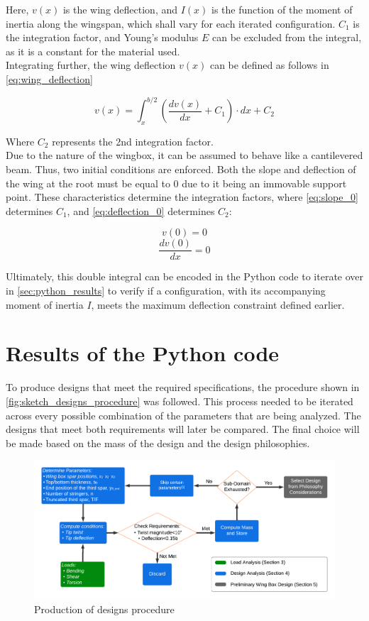 \noindent Here, $v(x)$ is the wing deflection, and $I(x)$ is the function of the moment of inertia along the wingspan, which shall vary for each iterated configuration. $C_1$ is the integration factor, and Young's modulus $E$ can be excluded from the integral, as it is a constant for the material used. \\


\noindent Integrating further, the wing deflection $v(x)$ can be defined as follows in \autoref{eq:wing_deflection}

\begin{equation} \label{eq:wing_deflection}
    v(x) = \int_{x}^{b/2} \left(\frac{dv(x)}{dx} + C_1 \right) \cdot dx + C_2
\end{equation}

\noindent Where $C_2$ represents the 2nd integration factor. \\

\noindent Due to the nature of the wingbox, it can be assumed to behave like a cantilevered beam. Thus, two initial conditions are enforced. Both the slope and deflection of the wing at the root must be equal to 0 due to it being an immovable support point. These characteristics determine the integration factors, where \autoref{eq:slope_0} determines $C_1$, and \autoref{eq:deflection_0} determines $C_2$:

\begin{equation} \label{eq:deflection_0}
    v(0) = 0
\end{equation}
\begin{equation} \label{eq:slope_0}
    \frac{dv(0)}{dx} = 0
\end{equation}

\noindent Ultimately, this double integral can be encoded in the Python code to iterate over in \autoref{sec:python_results} to verify if a configuration, with its accompanying moment of inertia $I$, meets the maximum deflection constraint defined earlier.


\section{Results of the Python code}
\label{sec:python_results}
To produce designs that meet the required specifications, the procedure shown in \autoref{fig:sketch_designs_procedure} was followed. This process needed to be iterated across every possible combination of the parameters that are being analyzed. The designs that meet both requirements will later be compared. The final choice will be made based on the mass of the design and the design philosophies.

\begin{figure}[H]
    \centering
    \includegraphics[width=\linewidth]{figures/Flowchart_Iteration.pdf}
    \caption{Production of designs procedure}
    \label{fig:sketch_designs_procedure}
\end{figure}